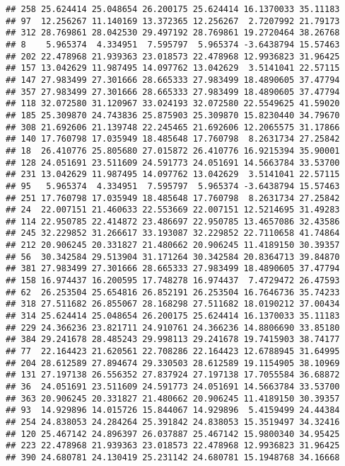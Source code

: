 \documentclass[
]{article}
\begin{document}
\begin{verbatim}
## 258 25.624414 25.048654 26.200175 25.624414 16.1370033 35.11183
## 97  12.256267 11.140169 13.372365 12.256267  2.7207992 21.79173
## 312 28.769861 28.042530 29.497192 28.769861 19.2720464 38.26768
## 8    5.965374  4.334951  7.595797  5.965374 -3.6438794 15.57463
## 202 22.478968 21.939363 23.018573 22.478968 12.9936823 31.96425
## 157 13.042629 11.987495 14.097762 13.042629  3.5141041 22.57115
## 147 27.983499 27.301666 28.665333 27.983499 18.4890605 37.47794
## 357 27.983499 27.301666 28.665333 27.983499 18.4890605 37.47794
## 118 32.072580 31.120967 33.024193 32.072580 22.5549625 41.59020
## 185 25.309870 24.743836 25.875903 25.309870 15.8230440 34.79670
## 308 21.692606 21.139748 22.245465 21.692606 12.2065575 31.17866
## 140 17.760798 17.035949 18.485648 17.760798  8.2631734 27.25842
## 18  26.410776 25.805680 27.015872 26.410776 16.9215394 35.90001
## 128 24.051691 23.511609 24.591773 24.051691 14.5663784 33.53700
## 231 13.042629 11.987495 14.097762 13.042629  3.5141041 22.57115
## 95   5.965374  4.334951  7.595797  5.965374 -3.6438794 15.57463
## 251 17.760798 17.035949 18.485648 17.760798  8.2631734 27.25842
## 24  22.007151 21.460633 22.553669 22.007151 12.5214695 31.49283
## 114 22.950785 22.414872 23.486697 22.950785 13.4657086 32.43586
## 245 32.229852 31.266617 33.193087 32.229852 22.7110658 41.74864
## 212 20.906245 20.331827 21.480662 20.906245 11.4189150 30.39357
## 56  30.342584 29.513904 31.171264 30.342584 20.8364713 39.84870
## 381 27.983499 27.301666 28.665333 27.983499 18.4890605 37.47794
## 158 16.974437 16.200595 17.748278 16.974437  7.4729472 26.47593
## 62  26.253504 25.654816 26.852191 26.253504 16.7646736 35.74233
## 318 27.511682 26.855067 28.168298 27.511682 18.0190212 37.00434
## 314 25.624414 25.048654 26.200175 25.624414 16.1370033 35.11183
## 229 24.366236 23.821711 24.910761 24.366236 14.8806690 33.85180
## 384 29.241678 28.485243 29.998113 29.241678 19.7415903 38.74177
## 77  22.164423 21.620561 22.708286 22.164423 12.6788945 31.64995
## 204 28.612589 27.894674 29.330503 28.612589 19.1154905 38.10969
## 131 27.197138 26.556352 27.837924 27.197138 17.7055584 36.68872
## 36  24.051691 23.511609 24.591773 24.051691 14.5663784 33.53700
## 363 20.906245 20.331827 21.480662 20.906245 11.4189150 30.39357
## 93  14.929896 14.015726 15.844067 14.929896  5.4159499 24.44384
## 254 24.838053 24.284264 25.391842 24.838053 15.3519497 34.32416
## 120 25.467142 24.896397 26.037887 25.467142 15.9800340 34.95425
## 223 22.478968 21.939363 23.018573 22.478968 12.9936823 31.96425
## 390 24.680781 24.130419 25.231142 24.680781 15.1948768 34.16668

\end{verbatim}
\end{document}
